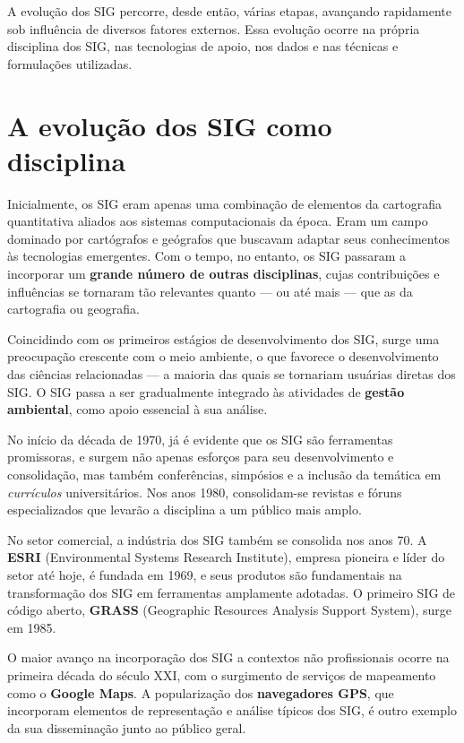A evolução dos SIG percorre, desde então, várias etapas, avançando rapidamente sob influência de diversos fatores externos. Essa evolução ocorre na própria disciplina dos SIG, nas tecnologias de apoio, nos dados e nas técnicas e formulações utilizadas.

\section{A evolução dos SIG como disciplina}

Inicialmente, os SIG eram apenas uma combinação de elementos da cartografia quantitativa aliados aos sistemas computacionais da época. Eram um campo dominado por cartógrafos e geógrafos que buscavam adaptar seus conhecimentos às tecnologias emergentes. Com o tempo, no entanto, os SIG passaram a incorporar um \textbf{grande número de outras disciplinas}, cujas contribuições e influências se tornaram tão relevantes quanto — ou até mais — que as da cartografia ou geografia.

Coincidindo com os primeiros estágios de desenvolvimento dos SIG, surge uma preocupação crescente com o meio ambiente, o que favorece o desenvolvimento das ciências relacionadas — a maioria das quais se tornariam usuárias diretas dos SIG. O SIG passa a ser gradualmente integrado às atividades de \textbf{gestão ambiental}, como apoio essencial à sua análise.

No início da década de 1970, já é evidente que os SIG são ferramentas promissoras, e surgem não apenas esforços para seu desenvolvimento e consolidação, mas também conferências, simpósios e a inclusão da temática em \emph{currículos} universitários. Nos anos 1980, consolidam-se revistas e fóruns especializados que levarão a disciplina a um público mais amplo.

No setor comercial, a indústria dos SIG também se consolida nos anos 70. A \textbf{ESRI} (Environmental Systems Research Institute), empresa pioneira e líder do setor até hoje, é fundada em 1969, e seus produtos são fundamentais na transformação dos SIG em ferramentas amplamente adotadas. O primeiro SIG de código aberto, \textbf{GRASS} (Geographic Resources Analysis Support System), surge em 1985.

O maior avanço na incorporação dos SIG a contextos não profissionais ocorre na primeira década do século XXI, com o surgimento de serviços de mapeamento como o \textbf{Google Maps}. A popularização dos \textbf{navegadores GPS}, que incorporam elementos de representação e análise típicos dos SIG, é outro exemplo da sua disseminação junto ao público geral.

